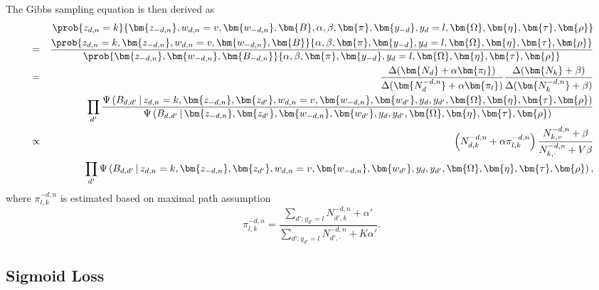 The Gibbs sampling equation is then derived as
\begin{eqnarray}
&&\prob {z_{d,n}=k} {\bm{z_{-d,n}}, w_{d,n}=v, \bm{w_{-d,n}}, \bm{B}, \alpha, \beta, \bm{\pi}, \bm{y_{-d}}, y_d=l, \bm{\Omega}, \bm{\eta}, \bm{\tau}, \bm{\rho}}\\
&=& \frac {\prob {z_{d,n}=k, \bm{z_{-d,n}}, w_{d,n}=v, \bm{w_{-d,n}}, \bm{B}} {\alpha, \beta, \bm{\pi}, \bm{y_{-d}}, y_d=l, \bm{\Omega}, \bm{\eta}, \bm{\tau}, \bm{\rho}}} {\prob {\bm{z_{-d,n}}, \bm{w_{-d,n}}, \bm{B_{-d,n}}} {\alpha, \beta, \bm{\pi}, \bm{y_{-d}}, y_d=l, \bm{\Omega}, \bm{\eta}, \bm{\tau}, \bm{\rho}}}\\
&=& \frac {\Delta(\bm{N_d}+\alpha \bm{\pi_l})} {\Delta(\bm{N_d^{-d,n}}+\alpha \bm{\pi_l})} \frac {\Delta(\bm{N_k} + \beta)} {\Delta(\bm{N_k^{-d,n}}+\beta)} \notag\\
&&\prod_{d'} \frac {\Psi \left( B_{d,d'} \,|\, z_{d,n}=k, \bm{z_{-d,n}}, \bm{z_{d'}}, w_{d,n}=v, \bm{w_{-d,n}}, \bm{w_{d'}}, y_d, y_{d'}, \bm{\Omega}, \bm{\eta}, \bm{\tau}, \bm{\rho} \right)} {\Psi \left( B_{d,d'} \,|\, \bm{z_{-d,n}}, \bm{z_{d'}}, \bm{w_{-d,n}}, \bm{w_{d'}}, y_d, y_{d'}, \bm{\Omega}, \bm{\eta}, \bm{\tau}, \bm{\rho} \right)}\\
&\propto& \left( N_{d,k}^{-d,n} + \alpha \pi_{l,k}^{-d,n} \right) \frac {N_{k,v}^{-d,n}+\beta} {N_{k,\cdot}^{-d,n}+V\beta} \notag\\
&&\prod_{d'} \Psi \left( B_{d,d'} \,|\, z_{d,n}=k, \bm{z_{-d,n}}, \bm{z_{d'}}, w_{d,n}=v, \bm{w_{-d,n}}, \bm{w_{d'}}, y_d, y_{d'}, \bm{\Omega}, \bm{\eta}, \bm{\tau}, \bm{\rho} \right),
\end{eqnarray}
where $\pi_{l,k}^{-d,n}$ is estimated based on maximal path assumption~\cite{cowans-2006-thesis,wallach-2008-thesis}
\begin{equation}
\pi_{l,k}^{-d,n} = \frac {\sum_{d': y_{d'}=l} N_{d',k}^{-d,n} + \alpha'} {\sum_{d': y_{d'}=l} N_{d',\cdot}^{-d,n} + K\alpha'}.
\end{equation}

\subsection{Sigmoid Loss}
\label{subsec:sigmoid_topic}

